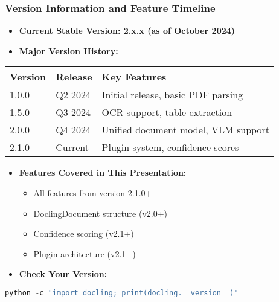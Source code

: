 \begin{frame}[fragile]\frametitle{Version Information and Feature Timeline}
      \begin{itemize}
        \item \textbf{Current Stable Version: 2.x.x (as of October 2024)}
        \item \textbf{Major Version History:}
      \end{itemize}

\begin{table}[h]
\centering
\small
\begin{tabular}{|l|l|p{6cm}|}
\hline
\textbf{Version} & \textbf{Release} & \textbf{Key Features} \\
\hline
1.0.0 & Q2 2024 & Initial release, basic PDF parsing \\
\hline
1.5.0 & Q3 2024 & OCR support, table extraction \\
\hline
2.0.0 & Q4 2024 & Unified document model, VLM support \\
\hline
2.1.0 & Current & Plugin system, confidence scores \\
\hline
\end{tabular}
\end{table}

      \begin{itemize}
        \item \textbf{Features Covered in This Presentation:}
        \begin{itemize}
            \item All features from version 2.1.0+
            \item DoclingDocument structure (v2.0+)
            \item Confidence scoring (v2.1+)
            \item Plugin architecture (v2.1+)
        \end{itemize}
        \item \textbf{Check Your Version:}
      \end{itemize}
      
\begin{lstlisting}[language=Python, basicstyle=\tiny]
python -c "import docling; print(docling.__version__)"
\end{lstlisting}
\end{frame}



